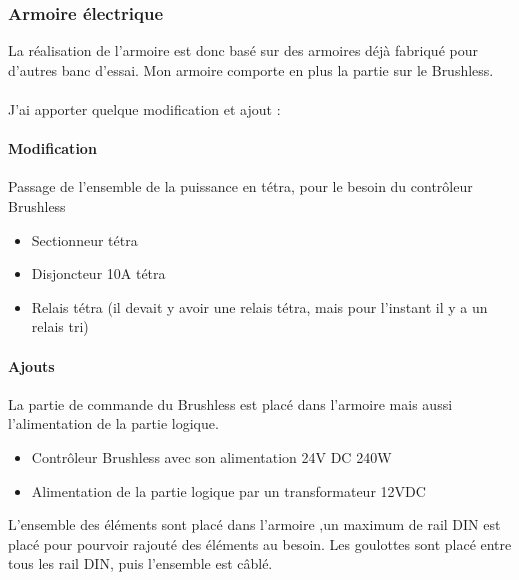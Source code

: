 \documentclass[11pt]{article}
\begin{document}
\FloatBarrier

\subsubsection{Armoire électrique}
La réalisation de l'armoire est donc basé sur des armoires déjà fabriqué pour d'autres banc d'essai. Mon armoire comporte en plus la partie sur le Brushless.\\
\\
J'ai apporter quelque modification et ajout :

\paragraph{Modification \\}

Passage de l'ensemble de la puissance en tétra, pour le besoin du contrôleur Brushless
	\begin{itemize}
		\item Sectionneur tétra
		\item Disjoncteur 10A tétra
		\item Relais tétra (il devait y avoir une relais tétra, mais pour l'instant il y a un relais tri)
	\end{itemize}

\paragraph{Ajouts\\}

La partie de commande du Brushless est placé dans l'armoire mais aussi l'alimentation de la partie logique.

\begin{itemize}
	\item Contrôleur Brushless avec son alimentation 24V DC 240W
	\item Alimentation de la partie logique par un transformateur 12VDC
\end{itemize}

L'ensemble des éléments sont placé dans l'armoire ,un maximum de rail DIN est placé pour pourvoir rajouté des éléments au besoin. Les goulottes sont placé entre tous les rail DIN, puis l'ensemble est câblé. 
\end{document}
